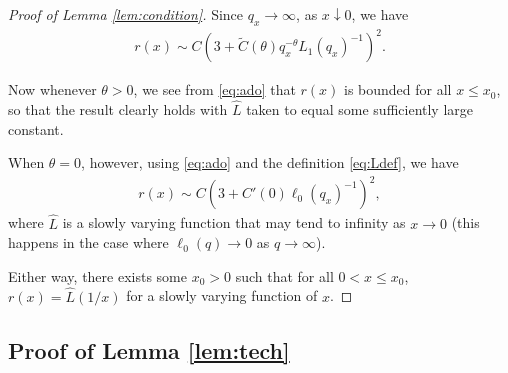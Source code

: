\documentclass[a4,12pt]{amsart}
\numberwithin{equation}{section}
\begin{document}
\begin{appendix}
\begin{proof}[Proof of Lemma \ref{lem:condition}]
Since $q_x \to \infty$, as $x \downarrow 0$, we have  
\begin{align} \label{eq:ado}
r(x) \sim C \left(3 + \tilde{C}(\theta)q_x^{-\theta} L_1(q_x)^{-1} \right)^2. 
\end{align}

Now whenever $\theta > 0$, we see from \eqref{eq:ado} that $r(x)$ is bounded for all $x \leq x_0$, so that the result clearly holds with $\hat{L}$ taken to equal some sufficiently large constant.

When $\theta = 0$, however, using \eqref{eq:ado} and the definition \eqref{eq:Ldef}, we have
\begin{align*}
r(x) \sim C \left(3 + C'(0) \ell_0(q_x)^{-1} \right)^2,
\end{align*}
where $\hat{L}$ is a slowly varying function that may tend to infinity as $x \to 0$ (this happens in the case where $\ell_0(q) \to 0$ as $q \to \infty$). 

Either way, there exists some $x_0>0$ such that for all $0 < x \leq x_0$, $r(x) = \hat{L}(1/x)$ for a slowly varying function of $x$.
\end{proof}

\color{Mahogany}
\subsection{Proof of Lemma \ref{lem:tech}}
\color{black}


\end{appendix}
\end{document}

